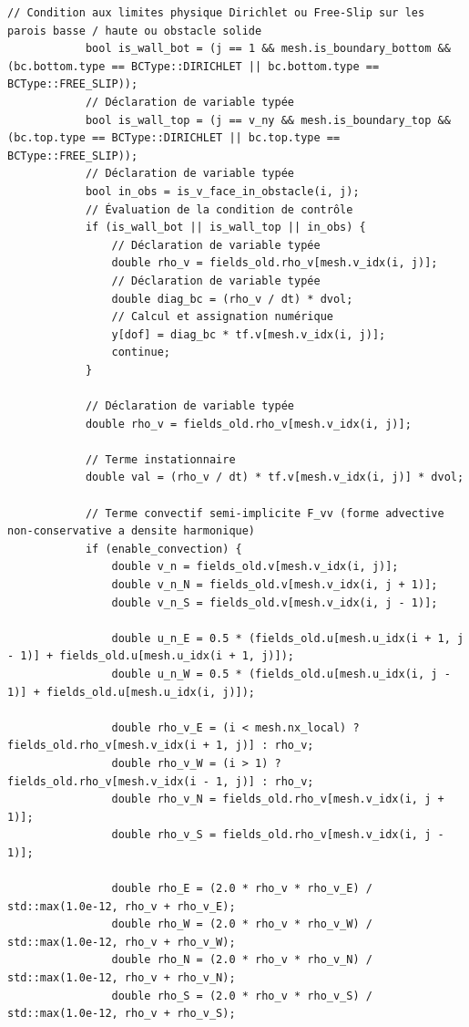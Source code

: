 \documentclass[10pt,a4paper,oneside]{book}
\begin{document}
\begin{lstlisting}[language={[11]C++}]
            // Condition aux limites physique Dirichlet ou Free-Slip sur les parois basse / haute ou obstacle solide
            bool is_wall_bot = (j == 1 && mesh.is_boundary_bottom && (bc.bottom.type == BCType::DIRICHLET || bc.bottom.type == BCType::FREE_SLIP));
            // Déclaration de variable typée
            bool is_wall_top = (j == v_ny && mesh.is_boundary_top && (bc.top.type == BCType::DIRICHLET || bc.top.type == BCType::FREE_SLIP));
            // Déclaration de variable typée
            bool in_obs = is_v_face_in_obstacle(i, j);
            // Évaluation de la condition de contrôle
            if (is_wall_bot || is_wall_top || in_obs) {
                // Déclaration de variable typée
                double rho_v = fields_old.rho_v[mesh.v_idx(i, j)];
                // Déclaration de variable typée
                double diag_bc = (rho_v / dt) * dvol;
                // Calcul et assignation numérique
                y[dof] = diag_bc * tf.v[mesh.v_idx(i, j)];
                continue;
            }

            // Déclaration de variable typée
            double rho_v = fields_old.rho_v[mesh.v_idx(i, j)];

            // Terme instationnaire
            double val = (rho_v / dt) * tf.v[mesh.v_idx(i, j)] * dvol;

            // Terme convectif semi-implicite F_vv (forme advective non-conservative a densite harmonique)
            if (enable_convection) {
                double v_n = fields_old.v[mesh.v_idx(i, j)];
                double v_n_N = fields_old.v[mesh.v_idx(i, j + 1)];
                double v_n_S = fields_old.v[mesh.v_idx(i, j - 1)];

                double u_n_E = 0.5 * (fields_old.u[mesh.u_idx(i + 1, j - 1)] + fields_old.u[mesh.u_idx(i + 1, j)]);
                double u_n_W = 0.5 * (fields_old.u[mesh.u_idx(i, j - 1)] + fields_old.u[mesh.u_idx(i, j)]);

                double rho_v_E = (i < mesh.nx_local) ? fields_old.rho_v[mesh.v_idx(i + 1, j)] : rho_v;
                double rho_v_W = (i > 1) ? fields_old.rho_v[mesh.v_idx(i - 1, j)] : rho_v;
                double rho_v_N = fields_old.rho_v[mesh.v_idx(i, j + 1)];
                double rho_v_S = fields_old.rho_v[mesh.v_idx(i, j - 1)];

                double rho_E = (2.0 * rho_v * rho_v_E) / std::max(1.0e-12, rho_v + rho_v_E);
                double rho_W = (2.0 * rho_v * rho_v_W) / std::max(1.0e-12, rho_v + rho_v_W);
                double rho_N = (2.0 * rho_v * rho_v_N) / std::max(1.0e-12, rho_v + rho_v_N);
                double rho_S = (2.0 * rho_v * rho_v_S) / std::max(1.0e-12, rho_v + rho_v_S);


\end{lstlisting}
\end{document}
